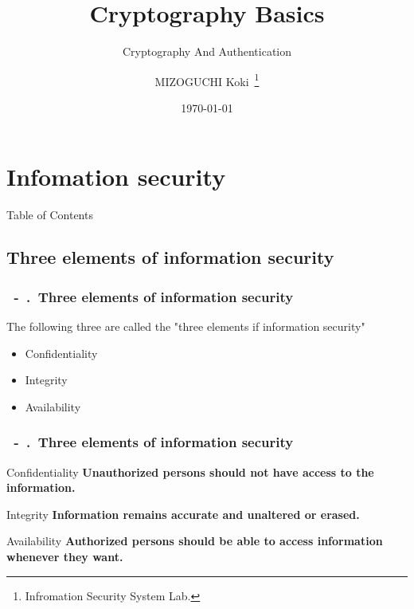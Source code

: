 \documentclass{beamer}
\title{Cryptography Basics}
\subtitle{Cryptography And Authentication}
\author[K.MIZOGUCHI]{MIZOGUCHI Koki\ \thanks{Infromation Security System Lab.}}
\date{\today}
\institute[KUT]{Kochi University of Technology}
\newcommand{\shownum}{\thesection\ -\ \thesubsection.\ }
\begin{document}
\begin{frame}
    \titlepage
\end{frame}
\section{Infomation security}
\begin{frame}{Table of Contents}
    \tableofcontents
\end{frame}
\subsection{Three elements of information security}
\newcommand{\threeelementsofinformationsecutiry}{\shownum Three elements of information security}
\begin{frame}
    \tableofcontents[currentsection,sectionstyle=show/shaded,subsectionstyle=shaded/shaded]
\end{frame}
\begin{frame}
    \frametitle{\threeelementsofinformationsecutiry}
    The following three are called the "three elements if information security"
    \begin{block}{}
        \begin{itemize}
            \item Confidentiality
            \item Integrity
            \item Availability
        \end{itemize}
    \end{block}
\end{frame}
\begin{frame}
    \frametitle{\threeelementsofinformationsecutiry}
    \begin{exampleblock}{Confidentiality}
        \textbf{Unauthorized persons should not have access to the information.}
    \end{exampleblock}
    \begin{exampleblock}{Integrity}
        \textbf{Information remains accurate and unaltered or erased.}
    \end{exampleblock}
    \begin{exampleblock}{Availability}
        \textbf{Authorized persons should be able to access information whenever they want.}
    \end{exampleblock}
\end{frame}
\end{document}
